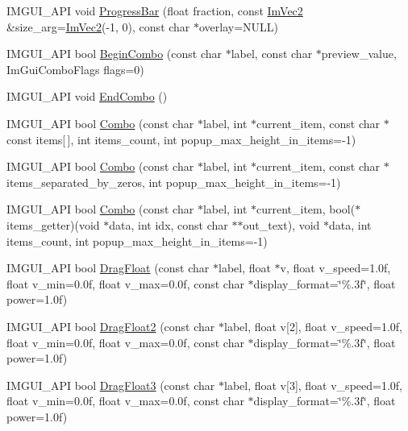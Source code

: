 \begin{DoxyCompactItemize}
\item 
I\+M\+G\+U\+I\+\_\+\+A\+PI void \hyperlink{namespace_im_gui_a83349d38c7c73f92ae977bc5b530a9e9}{Progress\+Bar} (float fraction, const \hyperlink{struct_im_vec2}{Im\+Vec2} \&size\+\_\+arg=\hyperlink{struct_im_vec2}{Im\+Vec2}(-\/1, 0), const char $\ast$overlay=N\+U\+LL)
\item 
I\+M\+G\+U\+I\+\_\+\+A\+PI bool \hyperlink{namespace_im_gui_aa895095bdc7a2907375c555e245575ea}{Begin\+Combo} (const char $\ast$label, const char $\ast$preview\+\_\+value, Im\+Gui\+Combo\+Flags flags=0)
\item 
I\+M\+G\+U\+I\+\_\+\+A\+PI void \hyperlink{namespace_im_gui_a63434692d7de278875c7ea0143fbe6e4}{End\+Combo} ()
\item 
I\+M\+G\+U\+I\+\_\+\+A\+PI bool \hyperlink{namespace_im_gui_aa2979368da5b9e98d368449b36d166b2}{Combo} (const char $\ast$label, int $\ast$current\+\_\+item, const char $\ast$const items\mbox{[}$\,$\mbox{]}, int items\+\_\+count, int popup\+\_\+max\+\_\+height\+\_\+in\+\_\+items=-\/1)
\item 
I\+M\+G\+U\+I\+\_\+\+A\+PI bool \hyperlink{namespace_im_gui_ab982779804105fdc57355868ab531cad}{Combo} (const char $\ast$label, int $\ast$current\+\_\+item, const char $\ast$items\+\_\+separated\+\_\+by\+\_\+zeros, int popup\+\_\+max\+\_\+height\+\_\+in\+\_\+items=-\/1)
\item 
I\+M\+G\+U\+I\+\_\+\+A\+PI bool \hyperlink{namespace_im_gui_ae667a68f13233556aa1de9f672dd3f25}{Combo} (const char $\ast$label, int $\ast$current\+\_\+item, bool($\ast$items\+\_\+getter)(void $\ast$data, int idx, const char $\ast$$\ast$out\+\_\+text), void $\ast$data, int items\+\_\+count, int popup\+\_\+max\+\_\+height\+\_\+in\+\_\+items=-\/1)
\item 
I\+M\+G\+U\+I\+\_\+\+A\+PI bool \hyperlink{namespace_im_gui_ac62335909eaaa63a1ead0226e836baeb}{Drag\+Float} (const char $\ast$label, float $\ast$v, float v\+\_\+speed=1.\+0f, float v\+\_\+min=0.\+0f, float v\+\_\+max=0.\+0f, const char $\ast$display\+\_\+format=\char`\"{}\%.\+3f\char`\"{}, float power=1.\+0f)
\item 
I\+M\+G\+U\+I\+\_\+\+A\+PI bool \hyperlink{namespace_im_gui_a2852e4c3b872ed5a5d28047f0290f29c}{Drag\+Float2} (const char $\ast$label, float v\mbox{[}2\mbox{]}, float v\+\_\+speed=1.\+0f, float v\+\_\+min=0.\+0f, float v\+\_\+max=0.\+0f, const char $\ast$display\+\_\+format=\char`\"{}\%.\+3f\char`\"{}, float power=1.\+0f)
\item 
I\+M\+G\+U\+I\+\_\+\+A\+PI bool \hyperlink{namespace_im_gui_a3a365703646c6fb5357f21a13c531bfe}{Drag\+Float3} (const char $\ast$label, float v\mbox{[}3\mbox{]}, float v\+\_\+speed=1.\+0f, float v\+\_\+min=0.\+0f, float v\+\_\+max=0.\+0f, const char $\ast$display\+\_\+format=\char`\"{}\%.\+3f\char`\"{}, float power=1.\+0f)
$$
\end{DoxyCompactItemize}
